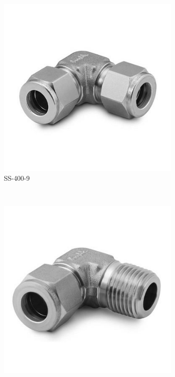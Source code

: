 \documentclass[a4paper,12pt,oneside]{article}
\begin{document}
\begin{appendices}
\begin{figure}[H]
    \centering
    \begin{subfigure}[b]{0.2\textwidth}
    \centering
    \includegraphics[width=\textwidth]{appendix/img/interfaces/SS-400-9.jpg}
    \caption{SS-400-9}
    \end{subfigure}
    ~
    \begin{subfigure}[b]{0.2\textwidth}
    \centering
    \includegraphics[width=\textwidth]{appendix/img/interfaces/SS-400-2-2.jpg}

\end{subfigure}
\end{figure}
\end{appendices}
\end{document}
